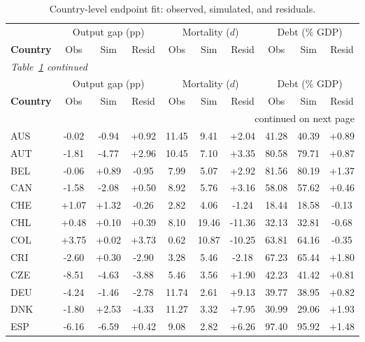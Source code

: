 \documentclass[12pt, a4paper]{article}
\begin{document}
\begin{longtable}{lccccccccc}
\caption{Country-level endpoint fit: observed, simulated, and residuals.}
\label{tab:country_endpoint}\\
\toprule
 & \multicolumn{3}{c}{Output gap (pp)} & \multicolumn{3}{c}{Mortality ($d$)} & \multicolumn{3}{c}{Debt (\% GDP)} \\
\cmidrule(lr){2-4}\cmidrule(lr){5-7}\cmidrule(lr){8-10}
\textbf{Country} & Obs & Sim & Resid & Obs & Sim & Resid & Obs & Sim & Resid \\
\midrule
\endfirsthead
\multicolumn{10}{l}{\scriptsize\itshape Table~\ref{tab:country_endpoint} continued}\\
\toprule
 & \multicolumn{3}{c}{Output gap (pp)} & \multicolumn{3}{c}{Mortality ($d$)} & \multicolumn{3}{c}{Debt (\% GDP)} \\
\cmidrule(lr){2-4}\cmidrule(lr){5-7}\cmidrule(lr){8-10}
\textbf{Country} & Obs & Sim & Resid & Obs & Sim & Resid & Obs & Sim & Resid \\
\midrule
\endhead
\midrule
\multicolumn{10}{r}{\scriptsize continued on next page}\\
\endfoot
\bottomrule
\endlastfoot
\scriptsize
AUS & -0.02 & -0.94 & +0.92 & 11.45 & 9.41 & +2.04 & 41.28 & 40.39 & +0.89 \\
AUT & -1.81 & -4.77 & +2.96 & 10.45 & 7.10 & +3.35 & 80.58 & 79.71 & +0.87 \\
BEL & -0.06 & +0.89 & -0.95 & 7.99 & 5.07 & +2.92 & 81.56 & 80.19 & +1.37 \\
CAN & -1.58 & -2.08 & +0.50 & 8.92 & 5.76 & +3.16 & 58.08 & 57.62 & +0.46 \\
CHE & +1.07 & +1.32 & -0.26 & 2.82 & 4.06 & -1.24 & 18.44 & 18.58 & -0.13 \\
CHL & +0.48 & +0.10 & +0.39 & 8.10 & 19.46 & -11.36 & 32.13 & 32.81 & -0.68 \\
COL & +3.75 & +0.02 & +3.73 & 0.62 & 10.87 & -10.25 & 63.81 & 64.16 & -0.35 \\
CRI & -2.60 & +0.30 & -2.90 & 3.28 & 5.46 & -2.18 & 67.23 & 65.44 & +1.80 \\
CZE & -8.51 & -4.63 & -3.88 & 5.46 & 3.56 & +1.90 & 42.23 & 41.42 & +0.81 \\
DEU & -4.24 & -1.46 & -2.78 & 11.74 & 2.61 & +9.13 & 39.77 & 38.95 & +0.82 \\
DNK & -1.80 & +2.53 & -4.33 & 11.27 & 3.32 & +7.95 & 30.99 & 29.06 & +1.93 \\
ESP & -6.16 & -6.59 & +0.42 & 9.08 & 2.82 & +6.26 & 97.40 & 95.92 & +1.48 \\

\end{longtable}
\end{document}
